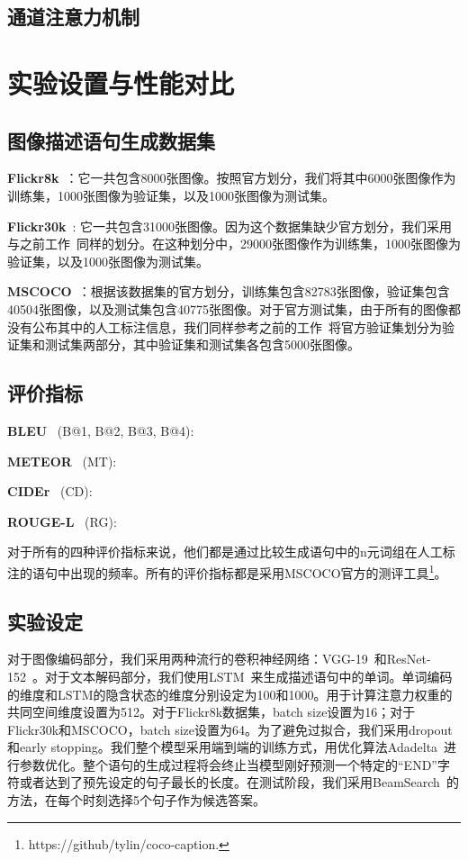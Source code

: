 \subsection{通道注意力机制}




\section{实验设置与性能对比}
\subsection{图像描述语句生成数据集}
\noindent\textbf{Flickr8k}~\cite{hodosh2013framing}：它一共包含8000张图像。按照官方划分，我们将其中6000张图像作为训练集，1000张图像为验证集，以及1000张图像为测试集。

\noindent\textbf{Flickr30k}~\cite{young2014image}: 它一共包含31000张图像。因为这个数据集缺少官方划分，我们采用与之前工作~\cite{karpathy2015deep}同样的划分。在这种划分中，29000张图像作为训练集，1000张图像为验证集，以及1000张图像为测试集。

\noindent\textbf{MSCOCO}~\cite{lin2014microsoft}：根据该数据集的官方划分，训练集包含82783张图像，验证集包含40504张图像，以及测试集包含40775张图像。对于官方测试集，由于所有的图像都没有公布其中的人工标注信息，我们同样参考之前的工作~\cite{karpathy2015deep}将官方验证集划分为验证集和测试集两部分，其中验证集和测试集各包含5000张图像。


\subsection{评价指标}
\noindent\textbf{BLEU}~\cite{papineni2002bleu} (B@1, B@2, B@3, B@4):

\noindent\textbf{METEOR}~\cite{banerjee2005meteor} (MT):

\noindent\textbf{CIDEr}~\cite{vedantam2015cider} (CD):

\noindent\textbf{ROUGE-L}~\cite{lin2002manual} (RG):


对于所有的四种评价指标来说，他们都是通过比较生成语句中的n元词组在人工标注的语句中出现的频率。所有的评价指标都是采用MSCOCO官方的测评工具\footnote{https://github/tylin/coco-caption.}。



\subsection{实验设定}
对于图像编码部分，我们采用两种流行的卷积神经网络：VGG-19~\cite{simonyan2015very}和ResNet-152~\cite{he2016deep}。对于文本解码部分，我们使用LSTM~\cite{hochreiter1997long}来生成描述语句中的单词。单词编码的维度和LSTM的隐含状态的维度分别设定为100和1000。用于计算注意力权重的共同空间维度设置为512。对于Flickr8k数据集，batch size设置为16；对于Flickr30k和MSCOCO，batch size设置为64。为了避免过拟合，我们采用dropout和early stopping。我们整个模型采用端到端的训练方式，用优化算法Adadelta~\cite{zeiler2012adadelta}进行参数优化。整个语句的生成过程将会终止当模型刚好预测一个特定的“END”字符或者达到了预先设定的句子最长的长度。在测试阶段，我们采用BeamSearch~\cite{vinyals2015show}的方法，在每个时刻选择5个句子作为候选答案。


